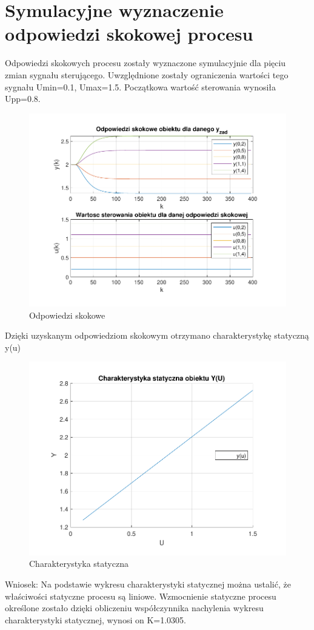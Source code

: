 \section{Symulacyjne wyznaczenie odpowiedzi skokowej procesu}

Odpowiedzi skokowych procesu zostały wyznaczone symulacyjnie dla pięciu zmian sygnału sterującego. 
Uwzględnione zostały ograniczenia wartości tego sygnału Umin=\num{0.1}, Umax=\num{1.5}. 
Początkowa wartość sterowania wynosiła Upp=\num{0.8}.

\begin{figure}[H]
    \centering
    \includegraphics[scale=0.8]{../projekt/zad2/odp_skok.pdf}
    \caption{ Odpowiedzi skokowe }
\end{figure}

Dzięki uzyskanym odpowiedziom skokowym otrzymano charakterystykę statyczną y(u)
\begin{figure}[H]
    \centering
    \includegraphics[scale=0.8]{../projekt/zad2/char_stat.pdf}
    \caption{Charakterystyka statyczna}
\end{figure}

Wniosek: 
Na podstawie wykresu charakterystyki statycznej można ustalić, 
że właściwości statyczne procesu są liniowe. 
Wzmocnienie statyczne procesu określone zostało dzięki obliczeniu współczynnika nachylenia 
wykresu charakterystyki statycznej, wynosi on K=\num{1.0305}.
